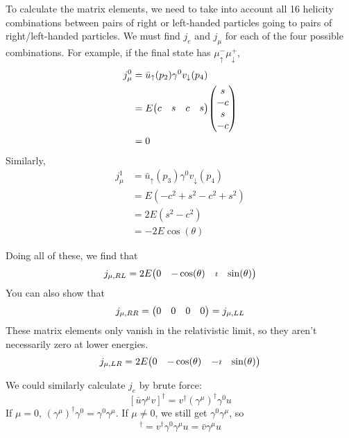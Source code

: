 \documentclass[a4paper,twoside,master.tex]{subfiles}
\begin{document}
To calculate the matrix elements, we need to take into account all 16 helicity combinations between pairs of right or left-handed particles going to pairs of right/left-handed particles. We must find $ j_e $ and $ j_{\mu} $ for each of the four possible combinations. For example, if the final state has $ \mu^-_{\uparrow} \mu^+_{\downarrow} $,
\begin{align}
    j_{\mu}^0 &= \bar{u}_{\uparrow}(p_2) \gamma^0 v_{\downarrow}(p_4) \\
              &= E \mqty(c & s & c & s) \mqty(s\\-c\\s\\-c)\\
              &= 0
\end{align}
Similarly,
\begin{align}
    j^1_{\mu} &= \bar{u}_{\uparrow}(p_3) \gamma^0 v_{\downarrow}(p_4) \\
              &= E(- c^2 + s^2 - c^2 + s^2) \\
              &= 2E(s^2 - c^2)\\
              &= - 2 E \cos(\theta)
\end{align}

Doing all of these, we find that
\begin{equation}
    j_{\mu, RL} = 2 E \mqty(0 & - \cos(\theta) & \imath & \sin(\theta))
\end{equation}
You can also show that
\begin{equation}
    j_{\mu, RR} = \mqty(0 & 0 & 0 & 0) = j_{\mu, LL}
\end{equation}
These matrix elements only vanish in the relativistic limit, so they aren't necessarily zero at lower energies.
\begin{equation}
    j_{\mu, LR} = 2E \mqty(0 & - \cos(\theta) & - \imath & \sin(\theta))
\end{equation}

We could similarly calculate $ j_e $ by brute force:
\begin{equation}
    \left[ \bar{u} \gamma^{\mu} v \right]^\dagger = v^\dagger (\gamma^{\mu})^\dagger \gamma^0 u
\end{equation}
If $ \mu = 0 $, $ (\gamma^{\mu})^\dagger \gamma^0 = \gamma^0 \gamma^{\mu} $. If $ \mu \neq 0 $, we still get $ \gamma^0 \gamma^{\mu} $, so
\begin{align}
    [ \bar{u} \gamma^{\mu} v]^\dagger = v^\dagger \gamma^0 \gamma^{\mu} u = \bar{v} \gamma^{\mu} u
\end{align}
\end{document}
